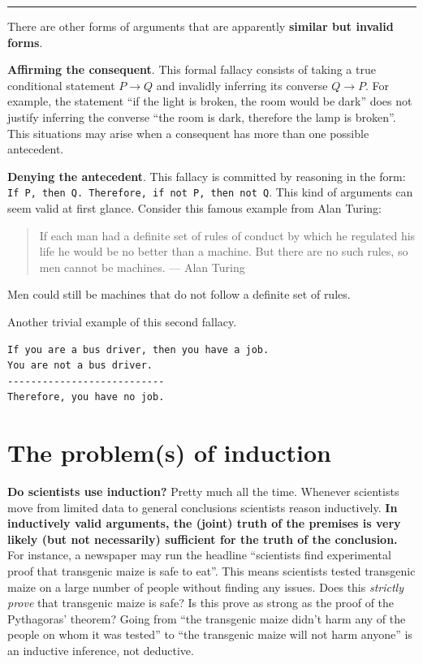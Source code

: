 \documentclass[
]{book}
\begin{document}
\begin{center}\rule{0.5\linewidth}{0.5pt}\end{center}

There are other forms of arguments that are apparently \textbf{similar but invalid forms}.

\textbf{Affirming the consequent}. This formal fallacy consists of taking a true conditional statement \(P \rightarrow Q\) and invalidly inferring its converse \(Q \rightarrow P\). For example, the statement ``if the light is broken, the room would be dark'' does not justify inferring the converse ``the room is dark, therefore the lamp is broken''. This situations may arise when a consequent has more than one possible antecedent.

\textbf{Denying the antecedent}. This fallacy is committed by reasoning in the form: \texttt{If\ P,\ then\ Q.\ Therefore,\ if\ not\ P,\ then\ not\ Q}. This kind of arguments can seem valid at first glance. Consider this famous example from Alan Turing:

\begin{quote}
If each man had a definite set of rules of conduct by which he regulated his life he would be no better than a machine. But there are no such rules, so men cannot be machines. --- Alan Turing
\end{quote}

Men could still be machines that do not follow a definite set of rules.

Another trivial example of this second fallacy.

\begin{verbatim}
If you are a bus driver, then you have a job.
You are not a bus driver.
---------------------------
Therefore, you have no job.
\end{verbatim}

\hypertarget{problem-induction}{%
\section{The problem(s) of induction}\label{problem-induction}}

\textbf{Do scientists use induction?} Pretty much all the time. Whenever scientists move from limited data to general conclusions scientists reason inductively. \textbf{In inductively valid arguments, the (joint) truth of the premises is very likely (but not necessarily) sufficient for the truth of the conclusion.} For instance, a newspaper may run the headline ``scientists find experimental proof that transgenic maize is safe to eat''. This means scientists tested transgenic maize on a large number of people without finding any issues. Does this \emph{strictly prove} that transgenic maize is safe? Is this prove as strong as the proof of the Pythagoras' theorem? Going from ``the transgenic maize didn't harm any of the people on whom it was tested'' to ``the transgenic maize will not harm anyone'' is an inductive inference, not deductive.
\end{document}
